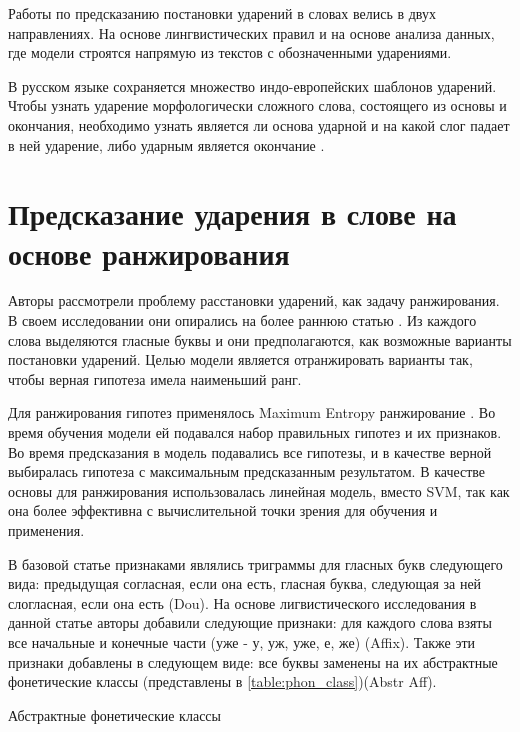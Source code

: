 \documentclass[14pt, a4paper, russian]{report}
\begin{document}
\begin{normalsize}
Работы по предсказанию постановки ударений в словах велись в двух направлениях. На основе лингвистических правил \cite{church, williams} и на основе анализа данных, где модели строятся напрямую из текстов с обозначенными ударениями. 

В русском языке сохраняется множество индо-европейских шаблонов ударений. Чтобы узнать ударение морфологически сложного слова, состоящего из основы и окончания, необходимо узнать является ли основа ударной и на какой слог падает в ней ударение, либо ударным является окончание \cite{halle}.
\section{Предсказание ударения в слове на основе ранжирования}
Авторы \cite{hall} рассмотрели проблему расстановки ударений, как задачу ранжирования. В своем исследовании  они опирались на более раннюю статью \cite{dou}. Из каждого слова выделяются гласные буквы и они предполагаются, как возможные варианты постановки ударений. Целью модели является отранжировать варианты так, чтобы верная гипотеза имела наименьший ранг.

Для ранжирования гипотез применялось Maximum Entropy ранжирование \cite{collins}. Во время обучения модели ей подавался набор правильных гипотез и их признаков. Во время предсказания в модель подавались все гипотезы, и в качестве верной выбиралась гипотеза с максимальным предсказанным результатом. В качестве основы для ранжирования использовалась линейная модель, вместо SVM, так как она более эффективна с вычислительной точки зрения для обучения и применения. 

В базовой статье \cite{dou} признаками являлись триграммы для гласных букв следующего вида: предыдущая согласная, если она есть, гласная буква, следующая за ней слогласная, если она есть (Dou). На основе лигвистического исследования в данной статье авторы добавили следующие признаки: для каждого слова взяты все начальные и конечные части (уже - у, уж, уже, е, же) (Affix). Также эти признаки добавлены в следующем виде: все буквы заменены на их абстрактные фонетические классы (представлены в \cref{table:phon_class})({Abstr Aff}).
\begin{table}[H]
		\caption{ Абстрактные фонетические классы}
	

\end{table}
\end{normalsize}
\end{document}
